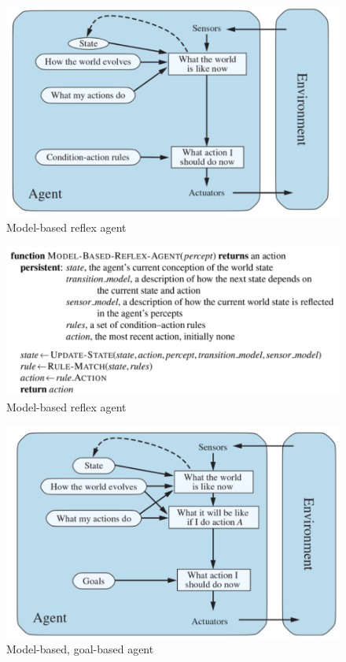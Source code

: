     \begin{figure}[hbt!]
        \centering
        \caption*{Model-based reflex agent}
        \includegraphics[scale = 0.75]{Assets/Model_Based_Agent_Flow_Chart}
    \end{figure}

    \begin{figure}[hbt!]
        \centering
        \caption*{Model-based reflex agent}
        \includegraphics[scale = 0.75]{Assets/Model_Based_Agent}
    \end{figure}

    \begin{figure}[hbt!]
        \centering
        \caption*{Model-based, goal-based agent}
        \includegraphics[scale = 0.75]{Assets/Model_Based_Goal_Based_Agent_Flow_Chart}
    \end{figure}

